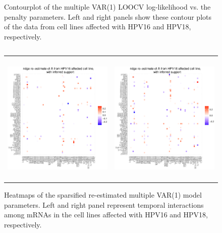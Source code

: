 \begin{figure}[h!]
\begin{tabular}{cc}
\end{tabular}
\caption{Contourplot of the multiple VAR(1) LOOCV log-likelihood vs. the penalty parameters. Left and right panels show these contour plots of the data from cell lines affected with HPV16 and HPV18, respectively.}
\label{fig:contourVAR2}
\end{figure}

\[
\]

\begin{figure}[h!]
\centering
\begin{tabular}{cc}
\includegraphics[width=2.9in, height=2.5in]{Figure_10a.eps}
&
\includegraphics[width=2.9in, height=2.5in]{Figure_10b.eps}
\end{tabular}
\caption{Heatmaps of the sparsified re-estimated multiple VAR(1) model parameters. Left and right panel represent temporal interactions among mRNAs in the cell lines affected with HPV16 and HPV18, respectively.}
\label{fig:VARmultipleEst}
\end{figure}

\[
\]



